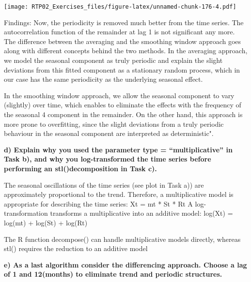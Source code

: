 \documentclass[
]{article}
\newenvironment{Shaded}{\begin{snugshade}}{\end{snugshade}}
\newcommand{\DataTypeTok}[1]{\textcolor[rgb]{0.13,0.29,0.53}{#1}}
\newcommand{\DecValTok}[1]{\textcolor[rgb]{0.00,0.00,0.81}{#1}}
\newcommand{\KeywordTok}[1]{\textcolor[rgb]{0.13,0.29,0.53}{\textbf{#1}}}
\newcommand{\NormalTok}[1]{#1}
\newcommand{\OperatorTok}[1]{\textcolor[rgb]{0.81,0.36,0.00}{\textbf{#1}}}
\newcommand{\StringTok}[1]{\textcolor[rgb]{0.31,0.60,0.02}{#1}}
\begin{document}
\begin{Shaded}
\end{Shaded}

\texttt{[image: RTP02\_Exercises\_files/figure-latex/unnamed-chunk-176-4.pdf]}

Findings: Now, the periodicity is removed much better from the time
series. The autocorrelation function of the remainder at lag 1 is not
significant any more. The difference between the averaging and the
smoothing window approach goes along with different concepts behind the
two methods. In the averaging approach, we model the seasonal component
as truly periodic and explain the slight deviations from this fitted
component as a stationary random process, which in our case has the same
periodicity as the underlying seasonal effect.

In the smoothing window approach, we allow the seasonal component to
vary (slightly) over time, which enables to eliminate the effects with
the frequency of the seasonal 4 component in the remainder. On the other
hand, this approach is more prone to overfitting, since the slight
deviations from a truly periodic behaviour in the seasonal component are
interpreted as deterministic".

\textbf{d) Explain why you used the parameter type = ``multiplicative''
in Task b), and why you log-transformed the time series before
performing an stl()decomposition in Task c).}

The seasonal oscillations of the time series (see plot in Task a)) are
approximately proportional to the trend. Therefore, a multiplicative
model is appropriate for describing the time series: Xt = mt * St * Rt A
log-transformation transforms a multiplicative into an additive model:
log(Xt) = log(mt) + log(St) + log(Rt)

The R function decompose() can handle multiplicative models directly,
whereas stl() requires the reduction to an additive model

\textbf{e) As a last algorithm consider the differencing approach.
Choose a lag of 1 and 12(months) to eliminate trend and periodic
structures.}
\end{document}
